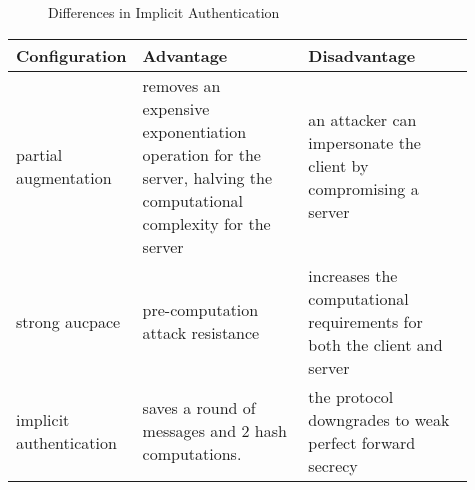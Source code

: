\begin{figure}[H]

  \caption{Differences in Implicit Authentication}
  \label{fig:implicit-auth-diffs}
\end{figure}

\begin{center}
  \small
  \begin{tabular}{ p{0.15\linewidth}p{0.38\linewidth}p{0.38\linewidth} }
    \toprule
    Configuration & Advantage & Disadvantage \\
    \midrule
    partial \newline augmentation & removes an expensive exponentiation operation for the server,
                                    halving the computational complexity for the server
      & an attacker can impersonate the client by compromising a server \\
    \rowcolor{mintbg}
    strong \newline \gls{aucpace} & pre-computation attack resistance
      & increases the computational requirements for both the client and server \\
    implicit \newline authentication & saves a round of messages and 2 hash computations.
      & the protocol downgrades to weak perfect forward secrecy \cite{hmqv} \\
    \bottomrule
  \end{tabular}
\end{center}

